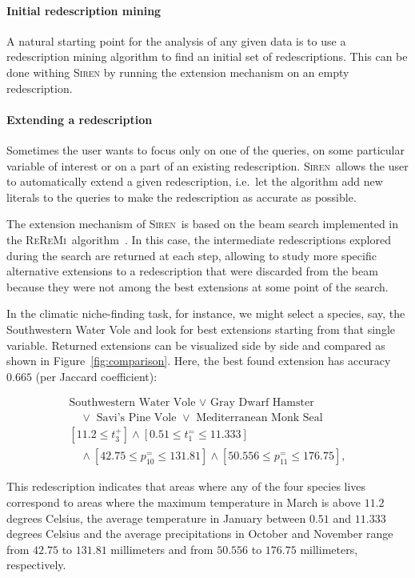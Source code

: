 \documentclass{sig-alternate}
\newcommand{\prg}[1]{\paragraph{#1}}
\newcommand{\Siren}{\textsc{Siren}}
\newcommand{\ReReMi}{\textsc{ReReMi}}
\begin{document}
\prg{Initial redescription mining} A natural starting point for the
analysis of any given data is to use a redescription mining algorithm
to find an initial set of redescriptions.
This can be done withing \Siren{} by running the extension mechanism on an empty redescription.
 
\prg{Extending a redescription} Sometimes the user wants to focus only
on one of the queries, on some particular variable of interest or on a
part of an existing redescription.  \Siren\ allows the user to
automatically extend a given redescription, i.e.\ let the algorithm
add new literals to the queries to make the redescription as accurate
as possible.

The extension mechanism of \Siren\ is based on the beam search
implemented in the \ReReMi\ algorithm~\cite{galbrun11black}. In this case, the intermediate redescriptions
explored during the search are returned at each step, allowing to study
more specific alternative extensions to a redescription that were discarded from the beam
because they were not among the best extensions at some point of the search.

In the climatic niche-finding task, for instance, we might select a
species, say, the Southwestern Water Vole and look for best extensions
starting from that single variable.  Returned extensions can be
visualized side by side and compared as shown in
Figure~\ref{fig:comparison}. Here, the best found extension has
accuracy $0.665$ (per Jaccard coefficient):

\begin{equation*}
\begin{array}{l}
\text{Southwestern Water Vole }\lor\text{ Gray Dwarf Hamster }\\[1mm]
\quad\lor\text{ Savi's Pine Vole }\lor\text{ Mediterranean Monk Seal}\\[3mm]
[11.2 \leq t_{3}^{+}] \land  [0.51 \leq t_{1}^{=} \leq 11.333]\\[1mm]
\quad\land  [42.75 \leq p_{10}^{=} \leq 131.81] \land [50.556 \leq p_{11}^{=} \leq 176.75],
\end{array}
\end{equation*}

This redescription indicates that areas where any of the four
species lives correspond to areas where the maximum temperature in
March is above $11.2$ degrees Celsius, the average temperature in January
between $0.51$ and $11.333$ degrees Celsius and the average precipitations in
October and November range from $42.75$ to $131.81$ millimeters and from $50.556$ to $176.75$ millimeters, respectively.
\end{document}
